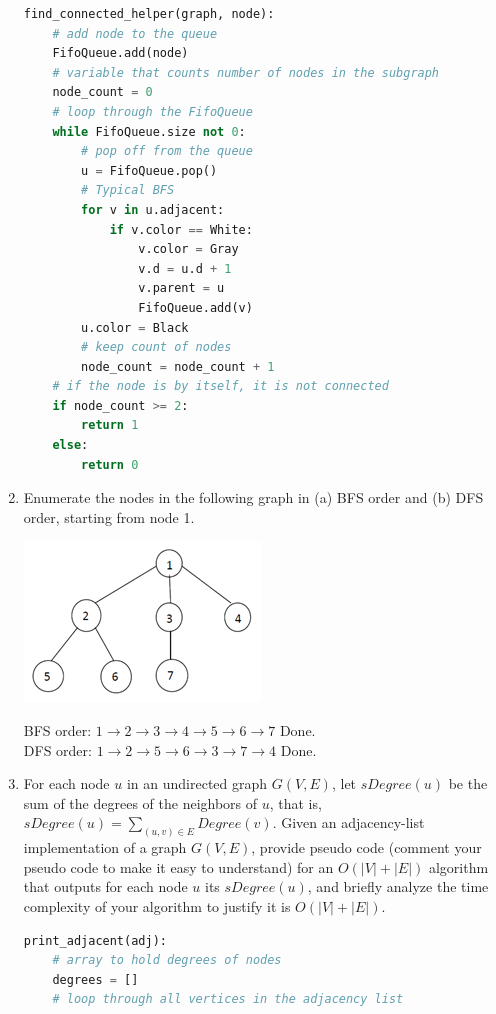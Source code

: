 \documentclass{article}
\begin{document}
\begin{enumerate}
\begin{lstlisting}[language=python]
find_connected_helper(graph, node):
    # add node to the queue
    FifoQueue.add(node)
    # variable that counts number of nodes in the subgraph
    node_count = 0
    # loop through the FifoQueue
    while FifoQueue.size not 0:
        # pop off from the queue
        u = FifoQueue.pop()
        # Typical BFS 
        for v in u.adjacent:
            if v.color == White:
                v.color = Gray
                v.d = u.d + 1
                v.parent = u
                FifoQueue.add(v)
        u.color = Black
        # keep count of nodes
        node_count = node_count + 1
    # if the node is by itself, it is not connected
    if node_count >= 2:
        return 1
    else:
        return 0
            \end{lstlisting}
        \item Enumerate the nodes in the following graph in (a) BFS order and 
        (b) DFS order, starting from node 1. 
            \begin{center}
                \includegraphics{tree1}
            \end{center}
            BFS order: $1 \rightarrow 2 \rightarrow 3 \rightarrow 4 \rightarrow 5 \rightarrow 6 \rightarrow 7$ Done.\\
            DFS order: $1 \rightarrow 2 \rightarrow 5 \rightarrow 6 \rightarrow 3 \rightarrow 7 \rightarrow 4$ Done.
        \item For each node $u$ in an undirected graph $G(V, E)$, let 
        $sDegree(u)$ be the sum of the degrees of the neighbors of $u$, that 
        is, $sDegree(u) = \sum_{(u,v)\in E}Degree(v)$. Given an adjacency-list 
        implementation of a graph $G(V, E)$, provide pseudo code (comment your 
        pseudo code to make it easy to understand) for an $O(|V|+|E|)$ 
        algorithm that outputs for each node $u$ its $sDegree(u)$, and briefly 
        analyze the time complexity of your algorithm to justify it is 
        $O(|V|+|E|)$.
            \begin{lstlisting}[language=python]
print_adjacent(adj):
    # array to hold degrees of nodes
    degrees = []
    # loop through all vertices in the adjacency list

\end{lstlisting}
\end{enumerate}
\end{document}
